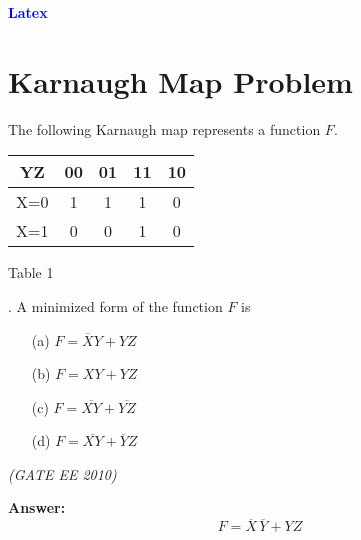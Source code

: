 \documentclass[a4paper,12pt]{article}
\begin{document}
\vspace*{1cm}
\begin{center}
	{\LARGE \textbf{\textcolor{blue}{Latex}}}
\end{center}

\section*{\textbf{Karnaugh Map Problem}}

The following Karnaugh map represents a function $F$.

\begin{center}
\renewcommand{\arraystretch}{1.4}
\setlength{\tabcolsep}{10pt}
\begin{tabular}{|c|c|c|c|c|}
\hline
YZ & 00 & 01 & 11 & 10 \\
\hline
X=0 & 1 & 1 & 1 & 0 \\
\hline
X=1 & 0 & 0 & 1 & 0 \\
\hline
\end{tabular}
\end{center}

\begin{center}
Table 1
\end{center}

. A minimized form of the function $F$ is
\begin{enumerate}
    \item[(a)] $F = \overline{X}Y + YZ$
    \item[(b)] $F = XY + YZ$
    \item[(c)] $F = \overline{XY} + \overline{YZ}$
    \item[(d)] $F = \overline{XY} + \overline{Y}Z$
\end{enumerate}

\hfill \textit{(GATE EE 2010)}

\vspace{0.5cm}
\noindent
\textbf{Answer:} \[
F = \overline{X}\,\overline{Y} + YZ
\]
\end{document}
